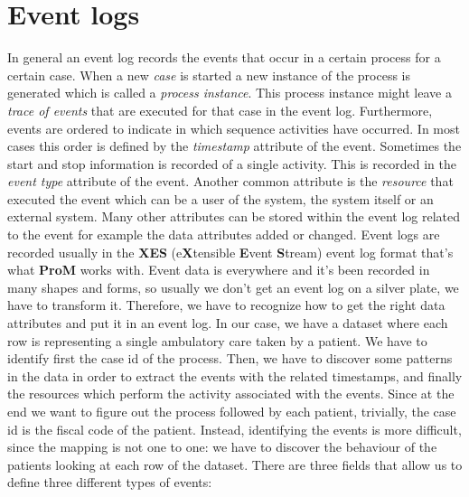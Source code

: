 \documentclass[paper=a4, fontsize=11pt]{scrartcl} %
\numberwithin{equation}{section} %
\numberwithin{figure}{section} %
\numberwithin{table}{section} %
\begin{document}
\section{Event logs}
In general an event log records the events that occur in a certain process for a certain case. When a new \textit{case} is started a new instance of the process is generated which is called a \textit{process instance}. This process instance might leave a \textit{trace of events} that are executed for that case in the event log. Furthermore, events are ordered to indicate in which sequence activities have occurred. In most cases this order is defined by the \textit{timestamp} attribute of the event. Sometimes the start and stop information is recorded of a single activity. This is recorded in the \textit{event type} attribute of the event. Another common attribute is the \textit{resource} that executed the event which can be a user of the system, the system itself or an external system. Many other attributes can be stored within the event log related to the event for example the data attributes added or changed. Event logs are recorded usually in the \textbf{XES} (e\textbf{X}tensible \textbf{E}vent \textbf{S}tream) event log format that's what \textbf{ProM} works with. Event data is everywhere and it's been recorded in many shapes and forms, so usually we don't get an event log on a silver plate, we have to transform it. Therefore, we have to recognize how to get the right data attributes and put it in an event log. In our case, we have a dataset where each row is representing a single ambulatory care taken by a patient. We have to identify first the case id of the process. Then, we have to discover some patterns in the data in order to extract the events with the related timestamps, and finally the resources which perform the activity associated with the events. Since at the end we want to figure out the process followed by each patient, trivially, the case id is the fiscal code of the patient. Instead, identifying the events is more difficult, since the mapping is not one to one: we have to discover the behaviour of the patients looking at each row of the dataset. There are three fields that allow us to define three different types of events:
\end{document}
